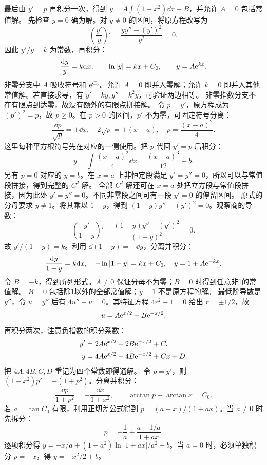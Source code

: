 最后由 $y'=p$ 再积分一次，得到 $\displaystyle y=A\int(1+x^2)\dd x+B$，并允许 $A=0$ 包括常值解。
先检查 $y=0$ 确为解。对 $y\ne0$ 的区间，将原方程改写为
\[
\left(\dfrac{y'}y\right)'=\dfrac{yy''-(y')^2}{y^2}=0.
\]
因此 $y'/y=k$ 为常数，再积分：
\[
\dfrac{\mathrm d y}y=k\mathrm d x,\qquad \ln|y|=kx+C_0,\qquad y=A\mathrm e^{kx}.
\]
非零分支中 $A$ 吸收符号和 $\mathrm e^{C_0}$。允许 $A=0$ 即并入零解；允许 $k=0$ 即并入其他常值解。若直接求导，有 $y'=ky,y''=k^2y$，可验证两边相等。
非零指数分支不在有限点到达零，故没有额外的有限点拼接解。
令 $p=y'$，原方程成为 $(p')^2=p$，故 $p\ge0$。在 $p>0$ 的区间，$p'$ 不为零，可固定符号分离：
\[
\dfrac{\dd p}{\sqrt p}=\pm\dd x,
\quad 2\sqrt p=\pm(x-a),
\quad p=\dfrac{(x-a)^2}{4}.
\]
这里每种平方根符号先在对应的一侧使用。把 $p$ 代回 $y'=p$ 后积分：
\[
y=\int\dfrac{(x-a)^2}{4}\dd x=\dfrac{(x-a)^3}{12}+b.
\]
另有 $p=0$ 对应的 $y=b$。在 $x=a$ 上非恒定段满足 $y'=y''=0$，所以可以与常值段拼接，得到完整的 $C^2$ 解。
全部 $C^2$ 解还可在 $x=a$ 处把立方段与常值段拼接，因为此处 $y'=y''=0$。不同非零段之间可有一段 $y'=0$ 的停留区间。
原式的分母要求 $y\ne1$。将其乘以 $1-y$，得到 $(1-y)y''+(y')^2=0$。观察商的导数：
\[
\left(\dfrac{y'}{1-y}\right)'
=\dfrac{(1-y)y''+(y')^2}{(1-y)^2}=0.
\]
故 $y'/(1-y)=k$。利用 $\dd(1-y)=-\dd y$，分离并积分：
\[
\dfrac{\mathrm d y}{1-y}=k\mathrm d x,
\quad-\ln|1-y|=kx+C_0,
\quad y=1+A\mathrm e^{-kx}.
\]
令 $B=-k$，得到所列形式。$A\ne0$ 保证分母不为零；$B=0$ 时得到任意非1的常值解。
$B=0$ 包括除1以外的全部常值解；$y=1$ 不是原方程的解。
最低阶导数是 $y''$，令 $u=y''$ 后有 $4u''-u=0$。其特征方程 $4r^2-1=0$ 给出 $r=\pm1/2$，故
\[
u=A\mathrm e^{x/2}+B\mathrm e^{-x/2}.
\]
再积分两次，注意负指数的积分系数：
\[
\begin{aligned}
y'&=2A\mathrm e^{x/2}-2B\mathrm e^{-x/2}+C,\\
y&=4A\mathrm e^{x/2}+4B\mathrm e^{-x/2}+Cx+D.
\end{aligned}
\]
把 $4A,4B,C,D$ 重记为四个常数即得通解。
令 $p=y'$，则 $(1+x^2)p'=-(1+p^2)$。分离并积分：
\[
\dfrac{\dd p}{1+p^2}=-\dfrac{\dd x}{1+x^2},
\qquad \arctan p+\arctan x=C_0.
\]
若 $a=\tan C_0$ 有限，利用正切差公式得到 $p=(a-x)/(1+ax)$。当 $a\ne0$ 时先拆分：
\[
p=-\dfrac1a+\dfrac{a+1/a}{1+ax}.
\]
逐项积分得 $y=-x/a+(1+a^2)\ln|1+ax|/a^2+b$。当 $a=0$ 时，必须单独积分 $p=-x$，得 $y=-x^2/2+b$。

